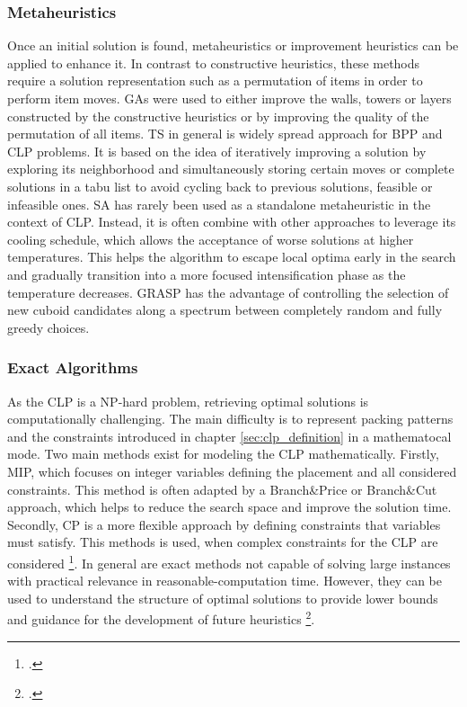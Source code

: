 \subsubsection{Metaheuristics}
Once an initial solution is found, metaheuristics or improvement heuristics can be applied
to enhance it. In contrast to constructive heuristics, these methods require a solution
representation such as a permutation of items in order to perform item moves. \gls{GA}s were
used to either improve the walls, towers or layers constructed by the constructive heuristics
or by improving the quality of the permutation of all items.
\gls{TS} in general is widely spread approach for \gls{BPP} and \gls{CLP} problems. It is based on
the idea of iteratively improving a solution by exploring its neighborhood and simultaneously
storing certain moves or complete solutions in a tabu list to avoid cycling back to
previous solutions, feasible or infeasible ones. \gls{SA} has rarely been used as a
standalone metaheuristic in the context of \gls{CLP}. Instead, it is often combine
with other approaches to leverage its cooling schedule, which allows the acceptance of
worse solutions at higher temperatures. This helps the algorithm to escape local optima
early in the search and gradually transition into a more focused intensification phase as
the temperature decreases. \gls{GRASP} has the advantage of controlling the selection of new
cuboid candidates along a spectrum between completely random and fully greedy choices.

\subsubsection{Exact Algorithms}
As the \gls{CLP} is a NP-hard problem, retrieving optimal solutions is computationally
challenging. The main difficulty is to represent packing patterns and the constraints
introduced in chapter \ref{sec:clp_definition} in a mathematocal mode. Two main methods
exist for modeling the \gls{CLP} mathematically. Firstly, \gls{MIP}, which focuses on
integer variables defining the placement and all considered constraints. This method is
often adapted by a Branch\&Price or Branch\&Cut approach, which helps to reduce the
search space and improve the solution time. Secondly, \gls{CP} is a more flexible
approach by defining constraints that variables must satisfy. This methods is used, when
complex constraints for the \gls{CLP} are considered \footcite[cf.][p. 7--11]{tamke_branch-and-cut_2024}.
In general are exact methods not capable of solving large instances with practical relevance
in reasonable-computation time. However, they can be used to understand the structure
of optimal solutions to provide lower bounds and guidance for the development of future
heuristics \footcite[cf.][p.2]{tamke_branch-and-cut_2024}.